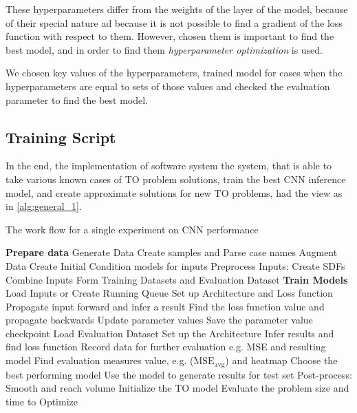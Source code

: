 These hyperparameters differ from the weights of the layer of the model, because of their special nature ad because it is not possible to find a gradient of the loss function with respect to them.
However, chosen them is important to find the best model, and in order to find them \textit{hyperparameter optimization} is used.
\medskip

We chosen key values of the hyperparameters, trained model for cases when the hyperparameters are equal to sets of those values and checked the evaluation parameter to find the best model.


\subsection{Training Script}

In the end, the implementation of software system the system, that is able to take various known cases of TO problem solutions, train the best CNN inference model, and create approximate solutions for new TO problems, had the view as in \ref{alg:general_1}.

\begin{algorithm}
\caption{The work flow for a single experiment on CNN performance}\label{alg:general_1}
\begin{algorithmic}[1]
	\State \textbf{Prepare data} 
	\State Generate Data
	\State Create samples and Parse case names
		\State Augment Data
		\State Create Initial Condition models for inputs
		\State Preprocess Inputs: Create SDFs
		\State Combine Inputs
	\EndFor
	\State Form Training Datasets and Evaluation Dataset
	\State \textbf{Train Models}
		\State Load Inputs or Create Running Queue
		\State Set up Architecture and Loss function 
			\State Propagate input forward and infer a result
			\State Find the loss function value and propagate backwards
			\State Update parameter values
		\EndWhile
		\State Save the parameter value checkpoint
	\EndFor
		\State Load Evaluation Dataset
		\State Set up the Architecture
			\State Infer results and find loss function
			\State Record data for further evaluation e.g. MSE and resulting model
		\EndFor
		\State Find evaluation measures value, e.g. ($\mathrm{MSE_{avg}}$) and heatmap
	\EndFor
	\State Choose the best performing model	
	\State Use the model to generate results for test set
		\State Post-process: Smooth and reach volume
		\State Initialize the TO model
		\State Evaluate the problem size and time to Optimize
	\EndFor
	
\end{algorithmic} 	
\end{algorithm}

